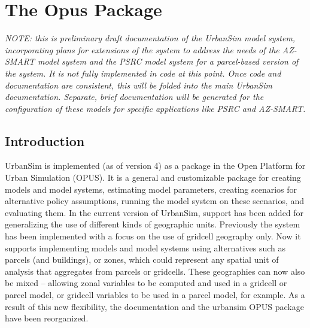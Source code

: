 

\chapter{The  Opus Package}

\emph{NOTE: this is preliminary draft documentation of the UrbanSim model system, incorporating
plans for extensions of the system to address the needs of the AZ-SMART model system and 
the PSRC model system for a parcel-based version of the system.  It is not fully implemented in 
code at this point.  Once code and
documentation are consistent, this will be folded into the main UrbanSim documentation.  Separate, 
brief documentation will be generated for the configuration of these models for specific
applications like PSRC and AZ-SMART.}

\section{Introduction}

UrbanSim is implemented (as of version 4) as a package in the Open Platform for Urban Simulation (OPUS).
It is a general and customizable package for creating models and model systems, estimating model
parameters, creating scenarios for alternative policy assumptions, running the model system on these
scenarios, and evaluating them.  In the current version of UrbanSim, support has been added for 
generalizing the use of different kinds of geographic units.  Previously the system has been implemented
with a focus on the use of gridcell geography only.  Now it supports implementing models and model
systems using alternatives such as parcels (and buildings), or zones, which could represent any spatial
unit of analysis that aggregates from parcels or gridcells.  These geographies can now also be mixed -- 
allowing zonal variables to be computed and used in a gridcell or parcel model, or gridcell variables to be
used in a parcel model, for example.  As a result of this new flexibility, the documentation and the urbansim 
OPUS package have been reorganized.

